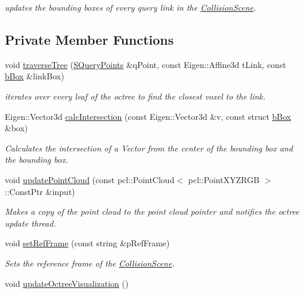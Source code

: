 \begin{DoxyCompactItemize}
\begin{DoxyCompactList}\small\item\em updates the bounding boxes of every query link in the \hyperlink{classCollisionScene}{Collision\-Scene}. \end{DoxyCompactList}\end{DoxyCompactItemize}
\subsection*{Private Member Functions}
\begin{DoxyCompactItemize}
\item 
void \hyperlink{classCollisionScene_a338284876502577c783b745ba7bac385}{traverse\-Tree} (\hyperlink{structCollisionScene_1_1SQueryPoints}{S\-Query\-Points} \&q\-Point, const Eigen\-::\-Affine3d t\-Link, const \hyperlink{structCollisionScene_1_1bBox}{b\-Box} \&link\-Box)
\begin{DoxyCompactList}\small\item\em iterates over every leaf of the octree to find the closest voxel to the link. \end{DoxyCompactList}\item 
Eigen\-::\-Vector3d \hyperlink{classCollisionScene_a287195084a9b8dd1eb7fbbf093766eb1}{calc\-Intersection} (const Eigen\-::\-Vector3d \&v, const struct \hyperlink{structCollisionScene_1_1bBox}{b\-Box} \&box)
\begin{DoxyCompactList}\small\item\em Calculates the intersection of a Vector from the center of the bounding box and the bounding box. \end{DoxyCompactList}\item 
void \hyperlink{classCollisionScene_a16b5e86c6b438cee575dbafb47506970}{update\-Point\-Cloud} (const pcl\-::\-Point\-Cloud$<$ pcl\-::\-Point\-X\-Y\-Z\-R\-G\-B $>$\-::Const\-Ptr \&input)
\begin{DoxyCompactList}\small\item\em Makes a copy of the point cloud to the point cloud pointer and notifies the octree update thread. \end{DoxyCompactList}\item 
void \hyperlink{classCollisionScene_a0458b7a7748c991626e7154b6cacbd0a}{set\-Ref\-Frame} (const string \&p\-Ref\-Frame)
\begin{DoxyCompactList}\small\item\em Sets the reference frame of the \hyperlink{classCollisionScene}{Collision\-Scene}. \end{DoxyCompactList}\item 
\hypertarget{classCollisionScene_a493a467161c0bab5d6717f58d96d3e00}{void \hyperlink{classCollisionScene_a493a467161c0bab5d6717f58d96d3e00}{update\-Octree\-Visualization} ()}\label{classCollisionScene_a493a467161c0bab5d6717f58d96d3e00}


\end{DoxyCompactItemize}
